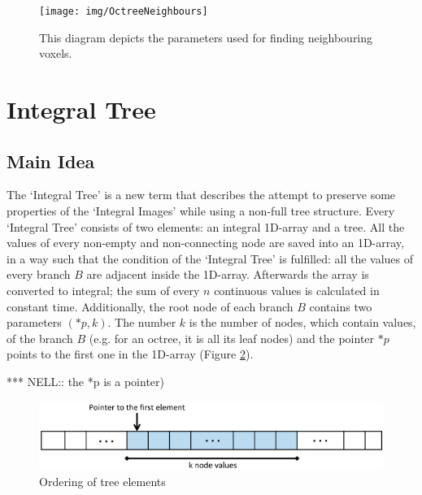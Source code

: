 \documentclass{subfiles}
\begin{document}
\begin{figure}[!htbp]
	\centering
	\texttt{[image: img/OctreeNeighbours]}
	\caption{This diagram depicts the parameters used for finding neighbouring voxels.}
	\label{fig:OctreeNeighbours}
\end{figure}


\newpage

\section{Integral Tree}\label{sec:ITopt}
\par 

\subsection{Main Idea }

\par The `Integral Tree' is a new term that describes the attempt to preserve some properties of the `Integral Images' while using a non-full tree structure. Every `Integral Tree' consists of two elements: an integral 1D-array and a tree. All the values of every non-empty and non-connecting node are saved into an 1D-array, in a way such that the condition of the `Integral Tree' is fulfilled: all the values of every branch $B$ are adjacent inside the 1D-array. Afterwards the array is converted to integral; the sum of every $n$ continuous values is calculated in constant time. Additionally, the root node of each branch $B$ contains two parameters $(*p, k)$. The number $k$ is the number of nodes, which contain values, of the branch $B$ (e.g. for an octree, it is all its leaf nodes) and the pointer $*p$ points to the first one in the 1D-array (Figure \ref{fig:IntegralTreeMainIdea}).
\par {\color{red} *** NELL:: the *p is a pointer)}

\begin{figure}[!htbp]
	\centering
	\includegraphics[width=5.5in]{img/IntegralTreeMainIdea}
	\caption{Ordering of tree elements}
	\label{fig:IntegralTreeMainIdea}
\end{figure}
\end{document}
